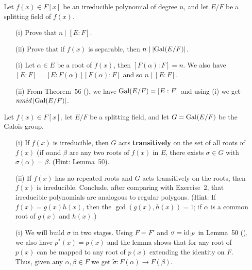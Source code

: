 \begin{myenumerate}

\item %
\begin{excopy}
Let \(f(x)\in F[x]\) be an irreducible polynomial of degree $n$,
and let \(E/F\) be a splitting field of \(f(x)\).
\begin{itemize}
 \item[(i)]
   Prove that \(n \mid [E:F]\).
 \item[(ii)]
   Prove that if \(f(x)\) is separable, then \(n \mid \left|\mathop{\rm Gal}\nolimits(E/F)\right|\).
\end{itemize}
\end{excopy}

\begin{itemize}
 \item[(i)]
 Let \(\alpha\in E\) be a root of \(f(x)\), then \([F(\alpha):F]=n\).
 We also have \([E:F]=[E:F(\alpha)][F(\alpha):F]\) and so \(n\mid [E:F]\).
 \item[(ii)]
    From Theorem~56 (\cite{Rotman98}), we have \(\mathop{\rm Gal}\nolimits(E/F)=[E:F]\)
    and using (i) we get \(n \\mid \left|\mathop{\rm Gal}\nolimits(E/F)\right|\).
\end{itemize}

\item %
\begin{excopy}
Let
\label{ex:trans}
\(f(x)\in F[x]\), let \(E/F\) be a splitting field, and let
\(G=\mathop{\rm Gal}\nolimits(E/F)\) be the Galois group.
\begin{itemize}
 \item[(i)]
   If \(f(x)\) is irreducible, then $G$
   acts \textbf{transitively} on the set of all roots of \(f(x)\)
   (if \(\alpha\)and \(\beta\) are any two roots of \(f(x)\) in $E$,
   there exists \(\sigma\in G\) with \(\sigma(\alpha)=\beta\).
   (Hint: Lemma~50).
 \item[(ii)]
   If \(f(x)\) has no
   repeated roots and $G$ acts transitively on the roots,
   then \(f(x)\) is irreducible. Conclude, after comparing with Exercise~2,
   that irreducible polynomials are analogous to regular polygons.
   (Hint: If \(f(x)=g(x)h(x)\), then the \(\gcd(g(x),h(x))=1\);
    if \(\alpha\) is a common root of \(g(x)\) and \(h(x)\).)

\end{itemize}
\end{excopy}

\begin{itemize}
 \item[(i)]
   We will build \(\sigma\) in two stages.
   Using \(F=F'\) and \(\sigma=\mathop{\rm id}\nolimits_{|F}\) in Lemma~50 (\cite{Rotman98}),
   we also have \(p^*(x)=p(x)\) and the lemma shows
   that for any root of \(p(x)\) can be mapped to any root of \(p(x)\)
   extending the identity on $F$.
   Thus, given any \(\alpha, \beta \in F\) we get
   \(\tilde{\sigma}: F(\alpha)\rightarrow F(\beta)\).


\end{itemize}
\end{myenumerate}
